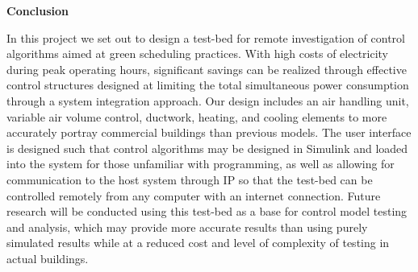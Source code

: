 \documentclass[a4paper,10pt,twocolumn]{article}
\begin{document}
\begin{center}
{\bf Conclusion}
\end{center}

In this project we set out to design a test-bed for remote investigation of control algorithms aimed at green scheduling practices.  With high costs of electricity during peak operating hours, significant savings can be realized through effective control structures designed at limiting the total simultaneous power consumption through a system integration approach.  Our design includes an air handling unit, variable air volume control, ductwork, heating, and cooling elements to more accurately portray commercial buildings than previous models.  The user interface is designed such that control algorithms may be designed in Simulink and loaded into the system for those unfamiliar with programming, as well as allowing for communication to the host system through IP so that the test-bed can be controlled remotely from any computer with an internet connection.  Future research will be conducted using this test-bed as a base for control model testing and analysis, which may provide more accurate results than using purely simulated results while at a reduced cost and level of complexity of testing in actual buildings.
\end{document}
